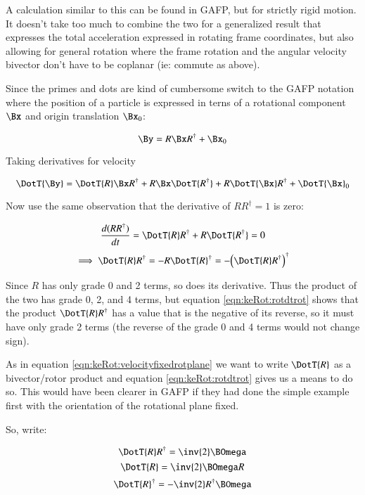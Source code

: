 A calculation similar to this can be found in GAFP, but for strictly rigid motion.  It doesn't take too much to combine the two for a generalized result that
expresses the total acceleration expressed in rotating frame coordinates, but also allowing for general rotation where the frame rotation and the angular velocity
bivector don't have to be coplanar (ie: commute as above).

Since the primes and dots are kind of cumbersome switch to the GAFP notation where the position of a particle is expressed in terns of a rotational component $\Bx$
and origin translation $\Bx_0$:

\[
\By = R \Bx R^\dagger + \Bx_0
\]

Taking derivatives for velocity

\begin{equation}\label{eqn:keRot:velocity}
\DotT{\By} = \DotT{R} \Bx R^\dagger +R \Bx \DotT{R^\dagger} +R \DotT{\Bx} R^\dagger + \DotT{\Bx}_0
\end{equation}

Now use the same observation that the derivative of $R R^\dagger = 1$ is zero:

\begin{equation*}
\frac{d (R R^\dagger)}{dt} = \DotT{R}R^\dagger + R \DotT{R^\dagger} = 0
\end{equation*}
\begin{equation}\label{eqn:keRot:rotdtrot}
\implies
\DotT{R}R^\dagger = 
 - R \DotT{R}^\dagger = -{\left( \DotT{R} R^\dagger \right)}^\dagger
\end{equation}

Since $R$ has only grade 0 and 2 terms, so does its derivative.  Thus the product of the two has grade 0, 2, and 4 terms, but 
equation \ref{eqn:keRot:rotdtrot} shows that the product $\DotT{R} R^\dagger$ has a value that is the negative of its reverse, so it must have
only grade 2 terms (the reverse of the grade 0 and 4 terms would not change sign).

As in equation \ref{eqn:keRot:velocityfixedrotplane} we want to write $\DotT{R}$ as a bivector/rotor product and equation \ref{eqn:keRot:rotdtrot} gives us a means to do so.
This would have been clearer in GAFP if they had done the simple example first with the orientation of the rotational plane fixed.

So, write:

\[
\DotT{R}R^\dagger = \inv{2}\BOmega
\]
\[
\DotT{R} = \inv{2}\BOmega R
\]
\[
\DotT{R}^\dagger = - \inv{2} R^\dagger \BOmega
\]

